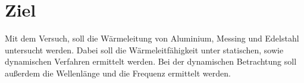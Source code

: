\section{Ziel}
\label{sec:ziel}
Mit dem Versuch, soll die Wärmeleitung von Aluminium, Messing und Edelstahl untersucht werden.
Dabei soll die Wärmeleitfähigkeit unter statischen, sowie dynamischen Verfahren ermittelt werden. Bei der dynamischen Betrachtung soll außerdem
die Wellenlänge und die Frequenz ermittelt werden.